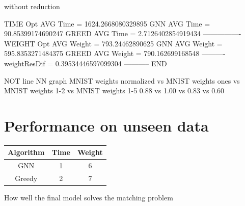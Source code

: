 without reduction

TIME
Opt AVG Time =  1624.2668080329895
GNN AVG Time =  90.85399174690247
GREED AVG Time =  2.7126402854919434
----------------
WEIGHT
Opt AVG Weight =  793.24462890625
GNN AVG Weight =  595.8353271484375
GREED AVG Weight =  790.162699168548
----------
weightResDif =  0.39534446597099304
-----------
END


NOT line NN graph MNIST weights normalized vs MNIST weights ones vs MNIST weights 1-2 vs MNIST weights 1-5
0.88 vs 1.00  vs 0.83 vs 0.60

\section{Performance on unseen data}

\begin{center}
\begin{tabular}{||c c c||} 
 \hline
 Algorithm & Time & Weight \\ [0.5ex] 
 \hline\hline
 GNN & 1 & 6 \\ 
 \hline
 Greedy & 2 & 7 \\ [1ex] 
 \hline
\end{tabular}
\end{center}

How well the final model solves the matching problem